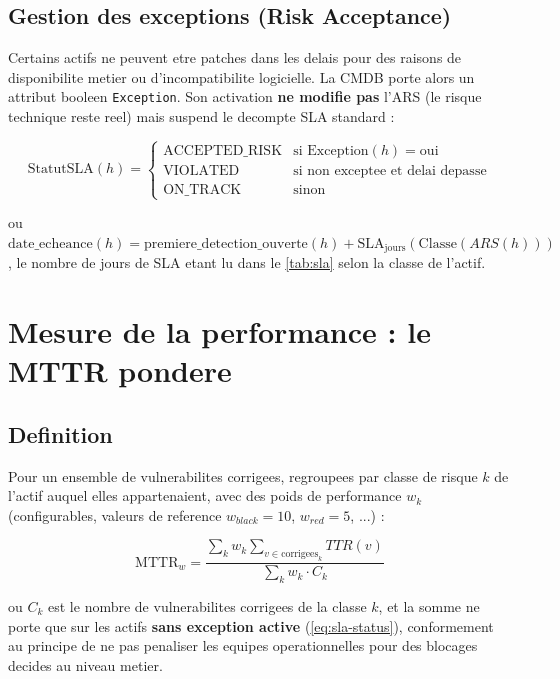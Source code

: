 \subsection{Gestion des exceptions (Risk Acceptance)}

Certains actifs ne peuvent etre patches dans les delais pour des raisons de
disponibilite metier ou d'incompatibilite logicielle. La CMDB porte alors un
attribut booleen \texttt{Exception}. Son activation \textbf{ne modifie pas} l'ARS
(le risque technique reste reel) mais suspend le decompte SLA standard :

\begin{equation}
\mathrm{StatutSLA}(h) =
\begin{cases}
\text{ACCEPTED\_RISK} & \text{si } \mathrm{Exception}(h) = \text{oui} \\
\text{VIOLATED} & \text{si non exceptee et delai depasse} \\
\text{ON\_TRACK} & \text{sinon}
\end{cases}
\label{eq:sla-status}
\end{equation}

ou $\text{date\_echeance}(h) = \text{premiere\_detection\_ouverte}(h) +
\mathrm{SLA}_{\mathrm{jours}}(\mathrm{Classe}(ARS(h)))$, le nombre de jours de SLA
etant lu dans le \cref{tab:sla} selon la classe de l'actif.

\section{Mesure de la performance : le MTTR pondere}

\subsection{Definition}

Pour un ensemble de vulnerabilites corrigees, regroupees par classe de risque $k$ de
l'actif auquel elles appartenaient, avec des poids de performance $w_k$
(configurables, valeurs de reference $w_{black}=10$, $w_{red}=5$, ...) :

\begin{equation}
\mathrm{MTTR}_w = \frac{\displaystyle\sum_k w_k \sum_{v \in \text{corrigees}_k} TTR(v)}
                       {\displaystyle\sum_k w_k \cdot C_k}
\label{eq:mttr}
\end{equation}

ou $C_k$ est le nombre de vulnerabilites corrigees de la classe $k$, et la somme ne
porte que sur les actifs \textbf{sans exception active} (\cref{eq:sla-status}),
conformement au principe de ne pas penaliser les equipes operationnelles pour des
blocages decides au niveau metier.

